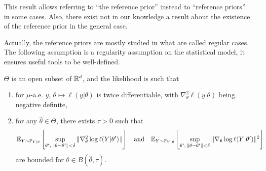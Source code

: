 This result allows referring to ``the reference prior'' instead to ``reference priors'' in some cases. %
Also, there exist not in our knowledge a result about the existence of the reference prior in the general case.

Actually, the reference priors are mostly studied in what are called regular cases.
The following assumption is a regularity assumption on the statistical model, it ensures useful tools to be well-defined.
\begin{assu}\label{assu:intro-ref:jeffreysexist}
    $\Theta$ is an open subset of $\mathbb{R}^d$, and the likelihood is such that
    \begin{enumerate}
        \item for $\mu$-a.e. $y$, $\theta\mapsto\ell(y|\theta)$ is twice differentiable, with $\nabla^2_\theta\ell(y|\theta)$ being negative definite,
        \item for any $\hat\theta\in\Theta$, there exists $\tau>0$ such that
        \begin{equation}
            \mathbb{E}_{Y\sim\mathbb{P}_{Y|\theta}}\left[\sup_{\theta',\,\|\theta-\theta'\|<\delta} \|\nabla^2_\theta\log\ell(Y|\theta')\| \right]\quad\text{and}\quad \mathbb{E}_{Y\sim\mathbb{P}_{Y|\theta}}\left[\sup_{\theta',\,\|\theta-\theta'\|<\delta}\|\nabla_\theta\log\ell(Y|\theta')\|^2\right]
        \end{equation}
        are bounded for $\theta\in B(\hat\theta,\tau)$.
    \end{enumerate}
\end{assu}

